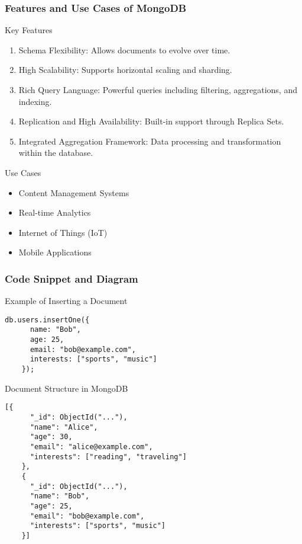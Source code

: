 \documentclass[aspectratio=169]{beamer}
\begin{document}
\begin{frame}[fragile]
    \frametitle{Features and Use Cases of MongoDB}
    \begin{block}{Key Features}
        \begin{enumerate}
            \item Schema Flexibility: Allows documents to evolve over time.
            \item High Scalability: Supports horizontal scaling and sharding.
            \item Rich Query Language: Powerful queries including filtering, aggregations, and indexing.
            \item Replication and High Availability: Built-in support through Replica Sets.
            \item Integrated Aggregation Framework: Data processing and transformation within the database.
        \end{enumerate}
    \end{block}
    
    \begin{block}{Use Cases}
        \begin{itemize}
            \item Content Management Systems
            \item Real-time Analytics
            \item Internet of Things (IoT)
            \item Mobile Applications
        \end{itemize}
    \end{block}
\end{frame}

\begin{frame}[fragile]
    \frametitle{Code Snippet and Diagram}
    \begin{block}{Example of Inserting a Document}
    \begin{lstlisting}[basicstyle=\small\ttfamily]
    db.users.insertOne({
      name: "Bob",
      age: 25,
      email: "bob@example.com",
      interests: ["sports", "music"]
    });
    \end{lstlisting}
    \end{block}
    
    \begin{block}{Document Structure in MongoDB}
    \begin{lstlisting}[basicstyle=\small\ttfamily]
    [{
      "_id": ObjectId("..."),
      "name": "Alice",
      "age": 30,
      "email": "alice@example.com",
      "interests": ["reading", "traveling"]
    },
    {
      "_id": ObjectId("..."),
      "name": "Bob",
      "age": 25,
      "email": "bob@example.com",
      "interests": ["sports", "music"]
    }]
    \end{lstlisting}
    \end{block}
\end{frame}
\end{document}
